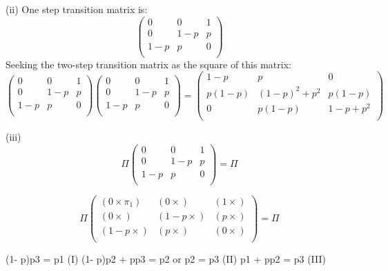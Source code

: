 \documentclass[a4paper,12pt]{article}
\begin{document}
\begin{enumerate}
\begin{enumerate}[(i)]
(ii) One step transition matrix is:
\[
\begin{pmatrix}
0 & 0 & 1\\
0 & 1-p & p \\
1-p & p & 0 \\
\end{pmatrix}
\]
Seeking the two-step transition matrix as the square of this matrix:
\[
\begin{pmatrix}
0 & 0 & 1\\
0 & 1-p & p \\
1-p & p & 0 \\
\end{pmatrix}\begin{pmatrix}
0 & 0 & 1\\
0 & 1-p & p \\
1-p & p & 0 \\
\end{pmatrix} = \begin{pmatrix}
1-p & p & 0\\
p(1-p) & (1-p)^2 + p^2 & p(1-p) \\
0 & p(1-p) & 1-p+p^2 \\
\end{pmatrix} 
\]

(iii)
\[ \Pi 
\begin{pmatrix}
0 & 0 & 1\\
0 & 1-p & p \\
1-p & p & 0 \\
\end{pmatrix}  = \Pi\]

\[ \Pi 
\begin{pmatrix}
(0 \times \pi_1) & (0 \times ) & (1 \times )\\
(0 \times ) & (1-p \times ) & (p \times ) \\
(1-p \times ) & (p \times ) & (0 \times ) \\
\end{pmatrix}  = \Pi\]


(1- p)p3 = p1 (I)
(1- p)p2 + pp3 = p2 or p2 = p3 (II)
p1 + pp2 = p3 (III)


\end{enumerate}
\end{enumerate}
\end{document}
